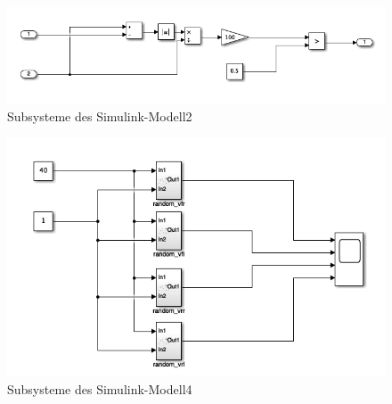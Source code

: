 \begin{figure}
	\centering
	\includegraphics[width=1\linewidth]{../Graphiken/Simulink3}
	\caption{Subsysteme des Simulink-Modell2}
	\label{fig:Simulink3}
\end{figure}

\begin{figure}
	\centering
	\includegraphics[width=1\linewidth]{../Graphiken/Simulink4}
	\caption{Subsysteme des Simulink-Modell4}
	\label{fig:Simulink4}
\end{figure}





	
	

	
	
	
	